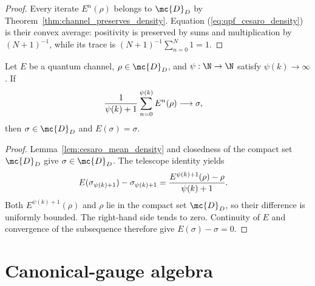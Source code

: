 \begin{proof}\leanok
    Every iterate $E^n(\rho)$ belongs to $\mc{D}_D$ by
    Theorem~\ref{thm:channel_preserves_density}. Equation
    (\ref{eq:qpf_cesaro_density}) is their convex average: positivity is
    preserved by sums and multiplication by $(N+1)^{-1}$, while its trace is
    $(N+1)^{-1}\sum_{n=0}^{N}1=1$.
\end{proof}

\begin{lemma}
    \label{lem:cesaro_subseq_fixed}
    \leanok
    Let $E$ be a quantum channel, $\rho\in\mc{D}_D$, and
    $\psi:\N\to\N$ satisfy $\psi(k)\to\infty$. If
    \begin{align}
        \frac{1}{\psi(k)+1}\sum_{n=0}^{\psi(k)}E^n(\rho)
         & \longrightarrow\sigma,
        \notag
    \end{align}
    then $\sigma\in\mc{D}_D$ and $E(\sigma)=\sigma$.
\end{lemma}

\begin{proof}\leanok
    Lemma~\ref{lem:cesaro_mean_density} and closedness of the compact set
    $\mc{D}_D$ give $\sigma\in\mc{D}_D$. The telescope identity yields
    \begin{align}
        E(\sigma_{\psi(k)+1})-\sigma_{\psi(k)+1}
         & =\frac{E^{\psi(k)+1}(\rho)-\rho}{\psi(k)+1}.
        \notag
    \end{align}
    Both $E^{\psi(k)+1}(\rho)$ and $\rho$ lie in the compact set
    $\mc{D}_D$, so their difference is uniformly bounded. The right-hand
    side tends to zero. Continuity of $E$ and convergence of the subsequence
    therefore give $E(\sigma)-\sigma=0$.
\end{proof}

\section{Canonical-gauge algebra}
\label{sec:app_qpf_gauge}

